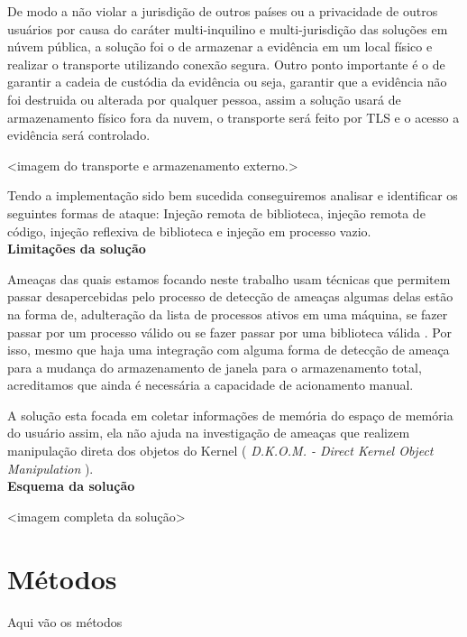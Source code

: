 \documentclass[
	12pt,				%
	openright,			%
	oneside,			%
	a4paper,			%
	english,			%
	french,				%
	spanish,			%
	brazil,				%
	]{abntex2}
\begin{document}
De modo a não violar a jurisdição de outros países ou a privacidade de outros usuários por causa do caráter multi-inquilino e multi-jurisdição das soluções em núvem pública,
a solução foi o de armazenar a evidência em um local físico e realizar o transporte utilizando conexão segura. Outro ponto importante é o de garantir a cadeia de custódia
da evidência ou seja, garantir que a evidência não foi destruida ou alterada por qualquer pessoa, assim a solução usará de armazenamento físico fora da nuvem, o transporte
será feito por TLS e o acesso a evidência será controlado.

<imagem do transporte e armazenamento externo.>

Tendo a implementação sido bem sucedida conseguiremos analisar e identificar os seguintes formas de ataque: Injeção remota de biblioteca, injeção remota de código, injeção
reflexiva de biblioteca e injeção em processo vazio.\\

\textbf{Limitações da solução}

Ameaças das quais estamos focando neste trabalho usam técnicas que permitem passar desapercebidas pelo processo de detecção de ameaças algumas delas estão na forma de, 
adulteração da lista de processos ativos em uma máquina, se fazer passar por um processo válido ou se fazer passar por uma biblioteca válida \cite{Case2014}. Por isso, 
mesmo que haja uma integração com alguma forma de detecção de ameaça para a mudança do armazenamento de janela para o armazenamento total, acreditamos que ainda é 
necessária a capacidade de acionamento manual.

A solução esta focada em coletar informações de memória do espaço de memória do usuário assim, ela não ajuda na investigação de ameaças que realizem manipulação direta
dos objetos do Kernel ( \textit{D.K.O.M. - Direct Kernel Object Manipulation} ).\\

\textbf{Esquema da solução}

<imagem completa da solução>

\chapter{Métodos}

Aqui vão os métodos

\end{document}
